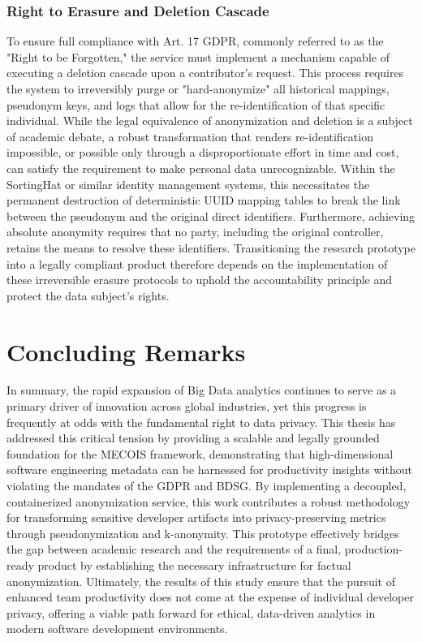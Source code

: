 \subsubsection{Right to Erasure and Deletion Cascade}
To ensure full compliance with Art. 17 \ac{GDPR}, commonly referred to as the "Right to be Forgotten," the service must implement a mechanism capable of executing a deletion cascade upon a contributor's request. This process requires the system to irreversibly purge or "hard-anonymize" all historical mappings, pseudonym keys, and logs that allow for the re-identification of that specific individual. While the legal equivalence of anonymization and deletion is a subject of academic debate, a robust transformation that renders re-identification impossible, or possible only through a disproportionate effort in time and cost, can satisfy the requirement to make personal data unrecognizable. Within the SortingHat or similar identity management systems, this necessitates the permanent destruction of deterministic \ac{UUID} mapping tables to break the link between the pseudonym and the original direct identifiers. Furthermore, achieving absolute anonymity requires that no party, including the original controller, retains the means to resolve these identifiers. Transitioning the research prototype into a legally compliant product therefore depends on the implementation of these irreversible erasure protocols to uphold the accountability principle and protect the data subject's rights.
\autocite[71--72,126--130]{Krebs2022}
\autocite[13,18--20,73--75]{gmdsbvd2024praxishilfe}
\autocite[13--17]{schwartmann2022praxisleitfaden}

\vspace{2cm}

\section{Concluding Remarks}

In summary, the rapid expansion of Big Data analytics continues to serve as a primary driver of innovation across global industries, yet this progress is frequently at odds with the fundamental right to data privacy. This thesis has addressed this critical tension by providing a scalable and legally grounded foundation for the MECOIS framework, demonstrating that high-dimensional software engineering metadata can be harnessed for productivity insights without violating the mandates of the \ac{GDPR} and \ac{BDSG}. By implementing a decoupled, containerized anonymization service, this work contributes a robust methodology for transforming sensitive developer artifacts into privacy-preserving metrics through pseudonymization and k-anonymity. This prototype effectively bridges the gap between academic research and the requirements of a final, production-ready product by establishing the necessary infrastructure for factual anonymization. Ultimately, the results of this study ensure that the pursuit of enhanced team productivity does not come at the expense of individual developer privacy, offering a viable path forward for ethical, data-driven analytics in modern software development environments.


